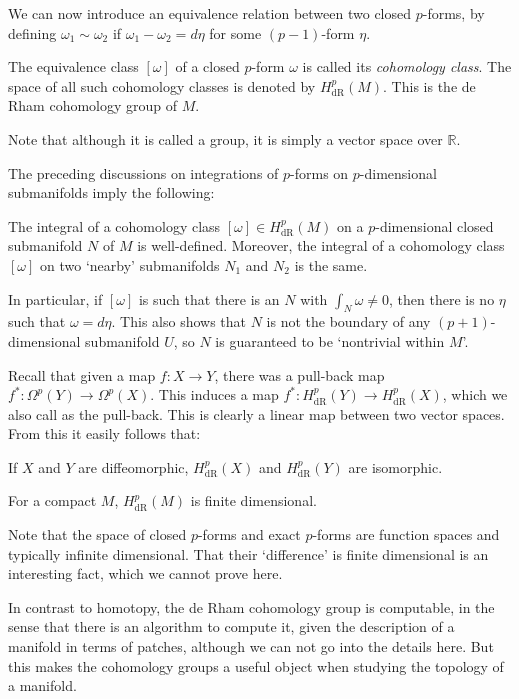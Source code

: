 \documentclass[12pt]{article}
\numberwithin{equation}{section}
\theoremstyle{remark}
\def\bR{\mathbb{R}}
\begin{document}
We can now introduce an equivalence relation between two closed $p$-forms, 
by defining $\omega_1\sim \omega_2$ if $\omega_1-\omega_2=d\eta$ for some $(p-1)$-form $\eta$.
\begin{definition}
  The equivalence class $[\omega]$ of a closed $p$-form $\omega$ is called its \emph{cohomology class}.
  The space of all such cohomology classes  is denoted by $H^p_\text{dR}(M)$.
  This is the de Rham cohomology group of $M$.
\end{definition}
Note that although it is called a group, it is simply a vector space over $\bR$.

The preceding discussions on integrations of $p$-forms on $p$-dimensional submanifolds imply the following:
\begin{proposition}
  The integral of a cohomology class $[\omega] \in H^p_\text{dR}(M)$ 
  on a $p$-dimensional closed submanifold $N$ of $M$ is well-defined.
  Moreover, the integral of a cohomology class $[\omega]$ on two `nearby' submanifolds $N_1$ and $N_2$ is the same.
\end{proposition}

In particular, if $[\omega]$ is such that there is an $N$ with $\int_N \omega\neq 0$,
then there is no $\eta$ such that $\omega=d\eta$.
This also shows that $N$ is not the boundary of any $(p+1)$-dimensional submanifold $U$,
so $N$ is guaranteed to be `nontrivial within $M$'.

Recall that given a map $f:X\to Y$, there was a pull-back map $f^*: \Omega^p(Y)\to \Omega^p(X)$.
This induces a map $f^*: H^p_\text{dR}(Y)\to H^p_\text{dR}(X)$,
which we also call as the pull-back.
This is clearly a linear map between two vector spaces. 
From this it easily follows that:
\begin{proposition}
  If $X$ and $Y$ are diffeomorphic, $H^p_\text{dR}(X)$ and $H^p_\text{dR}(Y)$ are isomorphic.
\end{proposition}

\begin{proposition}
  For a compact $M$, $H^p_\text{dR}(M)$ is finite dimensional.
\end{proposition}
Note that the space of closed $p$-forms and exact $p$-forms are function spaces
and typically infinite dimensional. 
That their `difference' is finite dimensional is an interesting fact,
which we cannot prove here.

In contrast to homotopy, the de Rham cohomology group is computable,
in the sense that there is an algorithm to compute it,
given the description of a manifold in terms of patches,
although we can not go into the details here.
But this makes the cohomology groups a useful object when studying the topology of a manifold.
\end{document}
